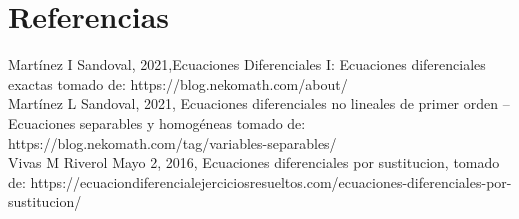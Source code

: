 \documentclass[l etterpaper,11pt]{article}
\begin{document}
\pagebreak
\section{Referencias}

Martínez I Sandoval, 2021,Ecuaciones Diferenciales I: Ecuaciones diferenciales exactas tomado de: https://blog.nekomath.com/about/\\

Martínez L Sandoval, 2021, Ecuaciones diferenciales no lineales de primer orden – Ecuaciones separables y homogéneas tomado de: https://blog.nekomath.com/tag/variables-separables/\\

Vivas M Riverol Mayo 2, 2016, Ecuaciones diferenciales por sustitucion, tomado de: https://ecuaciondiferencialejerciciosresueltos.com/ecuaciones-diferenciales-por-sustitucion/\\
\end{document}
